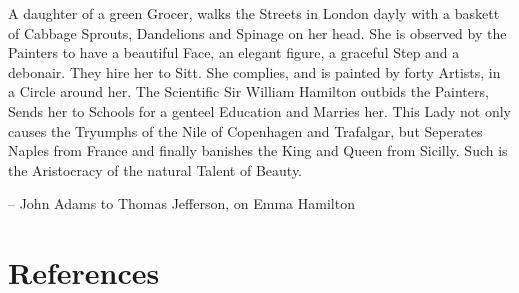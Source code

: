\documentclass[
  12pt,
]{article}
\theoremstyle{definition}
\theoremstyle{definition}
\theoremstyle{definition}
\theoremstyle{definition}
\theoremstyle{remark}
\begin{document}
A daughter of a green Grocer, walks the Streets in London dayly with a
baskett of Cabbage Sprouts, Dandelions and Spinage on her head. She is
observed by the Painters to have a beautiful Face, an elegant figure, a
graceful Step and a debonair. They hire her to Sitt. She complies, and
is painted by forty Artists, in a Circle around her. The Scientific Sir
William Hamilton outbids the Painters, Sends her to Schools for a
genteel Education and Marries her. This Lady not only causes the
Tryumphs of the Nile of Copenhagen and Trafalgar, but Seperates Naples
from France and finally banishes the King and Queen from Sicilly. Such
is the Aristocracy of the natural Talent of Beauty.

-- John Adams to Thomas Jefferson, on Emma Hamilton

\newpage

\hypertarget{references}{%
\section*{References}\label{references}}
\end{document}
